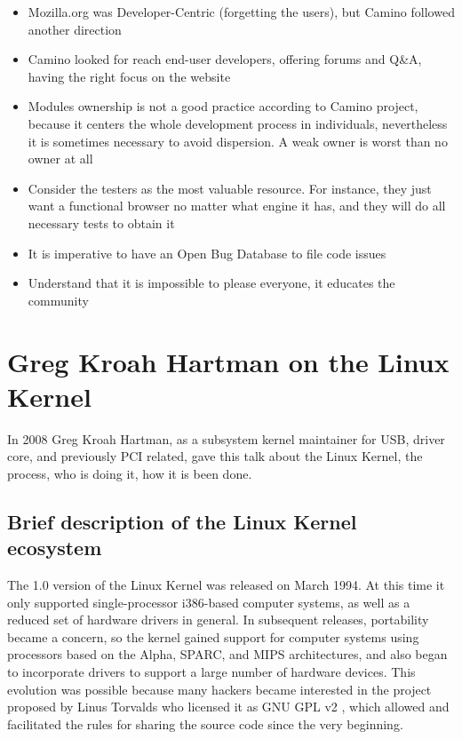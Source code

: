 \documentclass[11pt]{article} %
\begin{document}
\begin{itemize}
  	  \item Mozilla.org was Developer-Centric (forgetting the users), but Camino followed another direction
  	  \item Camino looked for reach end-user developers, offering forums and Q\&A, having the right focus on the website
  	  \item Modules ownership is not a good practice according to Camino project, because it centers the whole development process in individuals, nevertheless it is sometimes necessary to avoid dispersion. A weak owner is worst than no owner at all
  	  \item Consider the testers as the most valuable resource. For instance, they just want a functional browser no matter what engine it has, and they will do all necessary tests to obtain it
  	  \item It is imperative to have an Open Bug Database to file code issues
  	  \item Understand that it is impossible to please everyone, it educates the community
  	\end{itemize}

\section{Greg Kroah Hartman on the Linux Kernel}

In 2008 Greg Kroah Hartman, as a subsystem kernel maintainer for USB, driver core, and previously PCI related, gave this talk about the Linux Kernel, the process, who is doing it, how it is been done.

\subsection{Brief description of the Linux Kernel ecosystem}

The 1.0 version of the Linux Kernel was released on March 1994. At this time it only supported single-processor i386-based computer systems, as well as a reduced set of hardware drivers in general. In subsequent releases, portability became a concern, so the kernel gained support for computer systems using processors based on the Alpha, SPARC, and MIPS architectures, and also began to incorporate drivers to support a large number of hardware devices. This evolution was possible because many hackers became interested in the project proposed by Linus Torvalds who licensed it as GNU GPL v2 \cite{Torvalds:1991lt}, which allowed and facilitated the rules for sharing the source code since the very beginning.
\end{document}
